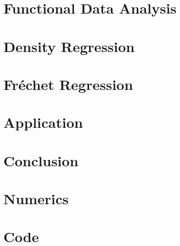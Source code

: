 \documentclass[12pt, a4paper, bibtotoc]{scrartcl}
\newif\ifshowpostsub
\theoremstyle{break}
\begin{document}
\section{Functional Data Analysis}
\label{sec:fda}


\section{Density Regression}
\label{sec:density regression}


\section{Fréchet Regression}
\label{sec:fréchet regression}


\ifshowpostsub
\section{A Common Transformation Framework}
\label{sec:comparison}

\fi

\section{Application}
\label{sec:application}


\clearpage  %
\newpage
\section{Conclusion}
\label{sec:conclusion}




\clearpage  %
\newpage

\nocite{Gaudecker2019}
\printbibliography


\newpage
\appendix
{}

\section{Numerics}
\label{sec:numerics}


\clearpage  %
\newpage
\section{Code}
\label{sec:code}

\end{document}
